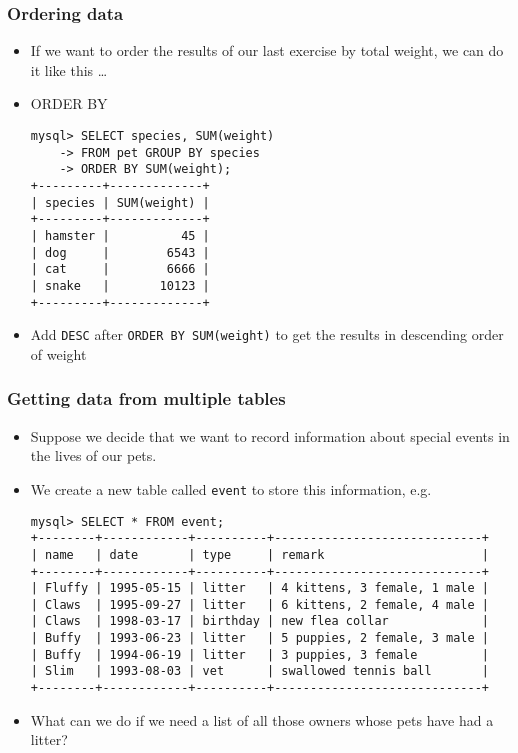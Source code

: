 \documentclass[hyperref={pdfpagelabels=false},svgnames,xcolor=table]{beamer}
\begin{document}
\begin{frame}[fragile]
  \frametitle{Ordering data}
  \begin{itemize}
    \item If we want to order the results of our last
      exercise by total weight, we can do it like this \ldots
    \item {\color{blue} ORDER BY}
\begin{verbatim}
mysql> SELECT species, SUM(weight)
    -> FROM pet GROUP BY species 
    -> ORDER BY SUM(weight);
+---------+-------------+
| species | SUM(weight) |
+---------+-------------+
| hamster |          45 |
| dog     |        6543 |
| cat     |        6666 |
| snake   |       10123 |
+---------+-------------+
\end{verbatim}
  \item Add \verb'DESC' after \verb'ORDER BY SUM(weight)' to get the
    results in descending order of weight
  \end{itemize}
\end{frame}

\begin{frame}[fragile]
  \frametitle{Getting data from multiple tables}
  \begin{itemize}
    \item Suppose we decide that we want to record information about
      special events in the lives of our pets.
    \item We create a new table called \verb'event' to store this
      information, e.g.\ 
      \begin{scriptsize}
\begin{verbatim}
mysql> SELECT * FROM event;
+--------+------------+----------+-----------------------------+
| name   | date       | type     | remark                      |
+--------+------------+----------+-----------------------------+
| Fluffy | 1995-05-15 | litter   | 4 kittens, 3 female, 1 male |
| Claws  | 1995-09-27 | litter   | 6 kittens, 2 female, 4 male |
| Claws  | 1998-03-17 | birthday | new flea collar             |
| Buffy  | 1993-06-23 | litter   | 5 puppies, 2 female, 3 male |
| Buffy  | 1994-06-19 | litter   | 3 puppies, 3 female         |
| Slim   | 1993-08-03 | vet      | swallowed tennis ball       |
+--------+------------+----------+-----------------------------+

\end{verbatim}
      \end{scriptsize}
    \item What can we do if we need a list of all those owners whose
      pets have had a litter?
  \end{itemize}
\end{frame}
\end{document}
